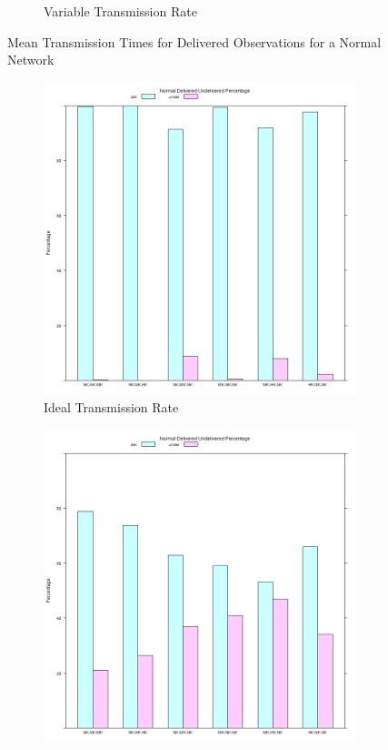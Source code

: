 \begin{figure}
\begin{subfigure}{\textwidth}
  \caption{Variable Transmission Rate}
	\label{fig:sim:res:norm:variable:delmean}
\end{subfigure}
\caption{Mean Transmission Times for Delivered Observations for a Normal Network}
\end{figure}

\begin{figure}[H]
\centering
\begin{subfigure}{.5\textwidth}
  \centering
\includegraphics[width=\linewidth]{Chap7/figures/plots/normal_ideal/delvsundel_percent.png}
  \caption{Ideal Transmission Rate}
\label{fig:sim:res:norm:ideal:delundel}
\end{subfigure}%
\begin{subfigure}{.5\textwidth}
  \centering
	\includegraphics[width=\linewidth]{Chap7/figures/plots/normal_variable/delvsundel_percent.png}

\end{subfigure}
\end{figure}
